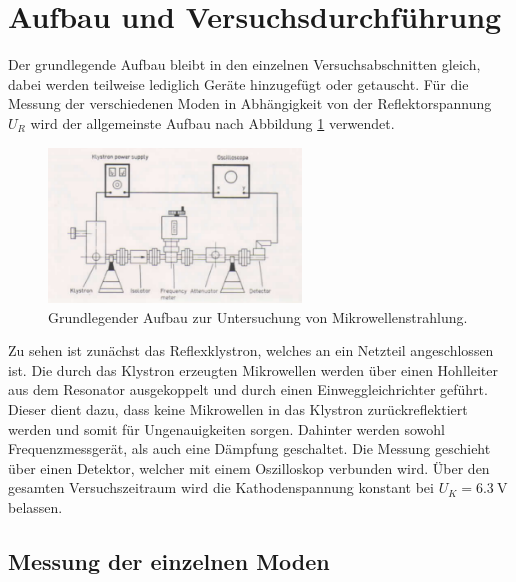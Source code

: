 \section{Aufbau und Versuchsdurchführung}

Der grundlegende Aufbau bleibt in den einzelnen Versuchsabschnitten gleich, dabei werden teilweise lediglich Geräte hinzugefügt oder getauscht. 
Für die Messung der verschiedenen Moden in Abhängigkeit von der Reflektorspannung $U_{R}$ wird der allgemeinste Aufbau nach Abbildung \ref{fig:1} verwendet.

\begin{figure}
    \centering
    \includegraphics[width=0.6\textwidth]{bilder/grundaufbau.png}
    \caption{Grundlegender Aufbau zur Untersuchung von Mikrowellenstrahlung. \cite{skript}} 
    \label{fig:1}
\end{figure}
Zu sehen ist zunächst das Reflexklystron, welches an ein Netzteil angeschlossen ist. Die durch das Klystron erzeugten Mikrowellen werden über einen Hohlleiter aus dem Resonator ausgekoppelt und durch einen Einweggleichrichter geführt. 
Dieser dient dazu, dass keine Mikrowellen in das Klystron zurückreflektiert werden und somit für Ungenauigkeiten sorgen. 
Dahinter werden sowohl Frequenzmessgerät, als auch eine Dämpfung geschaltet. Die Messung geschieht über einen Detektor, welcher mit einem Oszilloskop verbunden wird. 
Über den gesamten Versuchszeitraum wird die Kathodenspannung konstant bei $U_{K} = \SI{6.3}{\volt}$ belassen.

\subsection{Messung der einzelnen Moden}

